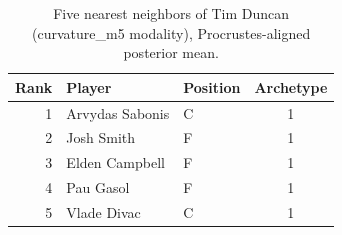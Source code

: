 \begin{table}[htbp]
  \centering\small
  \begin{tabular}{rllc}
    \toprule
    Rank & Player & Position & Archetype \\
    \midrule
    1 & Arvydas Sabonis & C & 1 \\
    2 & Josh Smith & F & 1 \\
    3 & Elden Campbell & F & 1 \\
    4 & Pau Gasol & F & 1 \\
    5 & Vlade Divac & C & 1 \\
    \bottomrule
  \end{tabular}
  \caption{Five nearest neighbors of Tim Duncan (curvature_m5 modality), Procrustes-aligned posterior mean.}
  \label{tab:Tim_Duncan_neighbors_curvature_m5}
\end{table}

